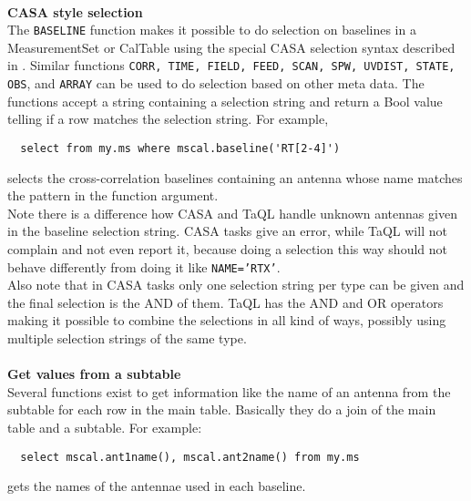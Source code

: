 \paragraph*{}
{\bf CASA style selection}
\\The \texttt{BASELINE} function makes it possible to do selection on
baselines in a MeasurementSet or CalTable using the special
CASA selection syntax described in .
Similar functions \texttt{CORR, TIME, FIELD, FEED, SCAN, SPW, UVDIST, STATE, OBS}, and
\texttt{ARRAY} can be used to do selection based on other meta data.
The functions accept a string containing a selection string
and return a Bool value telling if a row matches the
selection string. For example,
\begin{verbatim}
  select from my.ms where mscal.baseline('RT[2-4]')
\end{verbatim}
selects the cross-correlation baselines containing an antenna whose
name matches the pattern in the function argument.
\\Note there is a difference how CASA and TaQL handle unknown antennas
given in the baseline selection string. CASA tasks give an error, while
TaQL will not complain and not even report it, because doing a
selection this way should not behave differently from doing it like
\texttt{NAME='RTX'}. 
\\Also note that in CASA tasks only one selection string per type can be
given and the final selection is the AND of them. TaQL has
the AND and OR operators making it possible to combine the selections
in all kind of ways, possibly using multiple selection strings of the same type.

\paragraph*{}
{\bf Get values from a subtable}
\\Several functions exist to get information like the name of an antenna
from the subtable for each row in the main table. Basically they do a
join of the main table and a subtable. For example:
\begin{verbatim}
  select mscal.ant1name(), mscal.ant2name() from my.ms
\end{verbatim}
gets the names of the antennae used in each baseline.

